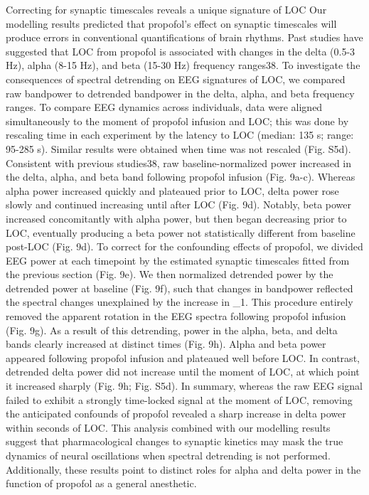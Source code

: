Correcting for synaptic timescales reveals a unique signature of LOC
Our modelling results predicted that propofol’s effect on synaptic timescales will produce errors in conventional quantifications of brain rhythms. Past studies have suggested that LOC from propofol is associated with changes in the delta (0.5-3 Hz), alpha (8-15 Hz), and beta (15-30 Hz) frequency ranges38. To investigate the consequences of spectral detrending on EEG signatures of LOC, we compared raw bandpower to detrended bandpower in the delta, alpha, and beta frequency ranges. To compare EEG dynamics across individuals, data were aligned simultaneously to the moment of propofol infusion and LOC; this was done by rescaling time in each experiment by the latency to LOC (median: 135 s; range: 95-285 s). Similar results were obtained when time was not rescaled (Fig. S5d). Consistent with previous studies38, raw baseline-normalized power increased in the delta, alpha, and beta band following propofol infusion (Fig. 9a-c). Whereas alpha power increased quickly and plateaued prior to LOC, delta power rose slowly and continued increasing until after LOC (Fig. 9d). Notably, beta power increased concomitantly with alpha power, but then began decreasing prior to LOC, eventually producing a beta power not statistically different from baseline post-LOC (Fig. 9d). 
To correct for the confounding effects of propofol, we divided EEG power at each timepoint by the estimated synaptic timescales fitted from the previous section (Fig. 9e). We then normalized detrended power by the detrended power at baseline (Fig. 9f), such that changes in bandpower reflected the spectral changes unexplained by the increase in \tau_1. This procedure entirely removed the apparent rotation in the EEG spectra following propofol infusion (Fig. 9g). As a result of this detrending, power in the alpha, beta, and delta bands clearly increased at distinct times (Fig. 9h). Alpha and beta power appeared following propofol infusion and plateaued well before LOC. In contrast, detrended delta power did not increase until the moment of LOC, at which point it increased sharply (Fig. 9h; Fig. S5d). In summary, whereas the raw EEG signal failed to exhibit a strongly time-locked signal at the moment of LOC, removing the anticipated confounds of propofol revealed a sharp increase in delta power within seconds of LOC. This analysis combined with our modelling results suggest that pharmacological changes to synaptic kinetics may mask the true dynamics of neural oscillations when spectral detrending is not performed. Additionally, these results point to distinct roles for alpha and delta power in the function of propofol as a general anesthetic. 
